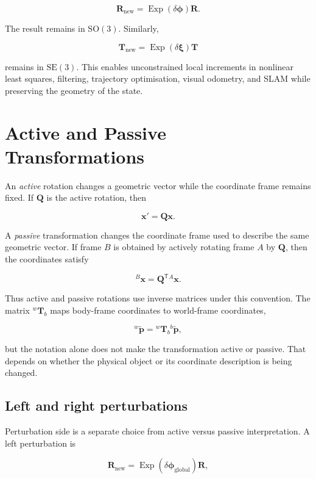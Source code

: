 \documentclass[10pt,a4paper]{article}
\numberwithin{equation}{section}
\newcommand{\Section}[1]{\section{#1}}
\newcommand{\Subsection}[1]{\subsection{#1}}
\newcommand{\SOthree}{\mathrm{SO}(3)}
\newcommand{\SEthree}{\mathrm{SE}(3)}
\newcommand{\Exp}{\operatorname{Exp}}
\newcommand{\vect}[1]{\boldsymbol{#1}}
\theoremstyle{definition}
\theoremstyle{exercisestyle}
\begin{document}
\begin{equation}
    \mathbf{R}_{\mathrm{new}}
    =\Exp(\delta\vect{\phi})\mathbf{R}.
\end{equation}

The result remains in $\SOthree$. Similarly,

\begin{equation}
    \mathbf{T}_{\mathrm{new}}
    =\Exp(\delta\vect{\xi})\mathbf{T}
\end{equation}

remains in $\SEthree$. This enables unconstrained local increments in nonlinear
least squares, filtering, trajectory optimisation, visual odometry, and SLAM
while preserving the geometry of the state.

\Section{Active and Passive Transformations}

An \emph{active} rotation changes a geometric vector while the coordinate frame
remains fixed. If $\mathbf{Q}$ is the active rotation, then

\begin{equation}
    \mathbf{x}'=\mathbf{Q}\mathbf{x}.
\end{equation}

A \emph{passive} transformation changes the coordinate frame used to describe
the same geometric vector. If frame $B$ is obtained by actively rotating frame
$A$ by $\mathbf{Q}$, then the coordinates satisfy

\begin{equation}
    {}^B\mathbf{x}=\mathbf{Q}^{\mathsf T}{}^A\mathbf{x}.
\end{equation}

Thus active and passive rotations use inverse matrices under this convention.
The matrix ${}^w\mathbf{T}_b$ maps body-frame coordinates to world-frame
coordinates,

\begin{equation}
    {}^w\widetilde{\mathbf{p}}
    ={}^w\mathbf{T}_b{}^b\widetilde{\mathbf{p}},
\end{equation}

but the notation alone does not make the transformation active or passive. That
depends on whether the physical object or its coordinate description is being
changed.

\Subsection{Left and right perturbations}

Perturbation side is a separate choice from active versus passive
interpretation. A left perturbation is

\begin{equation}
    \mathbf{R}_{\mathrm{new}}
    =\Exp(\delta\vect{\phi}_{\mathrm{global}})\mathbf{R},
\end{equation}
\end{document}
